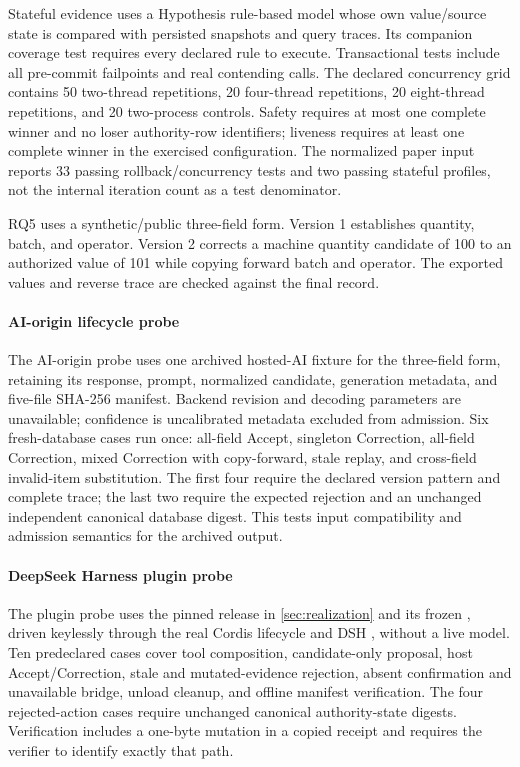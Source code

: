 Stateful evidence uses a Hypothesis rule-based model whose own value/source state is compared with persisted snapshots and query traces. Its companion coverage test requires every declared rule to execute. Transactional tests include all pre-commit failpoints and real contending calls. The declared concurrency grid contains 50 two-thread repetitions, 20 four-thread repetitions, 20 eight-thread repetitions, and 20 two-process controls. Safety requires at most one complete winner and no loser authority-row identifiers; liveness requires at least one complete winner in the exercised configuration. The normalized paper input reports 33 passing rollback/concurrency tests and two passing stateful profiles, not the internal iteration count as a test denominator.

RQ5 uses a synthetic/public three-field form. Version 1 establishes quantity, batch, and operator. Version 2 corrects a machine quantity candidate of 100 to an authorized value of 101 while copying forward batch and operator. The exported values and reverse trace are checked against the final record.

\paragraph{AI-origin lifecycle probe}
The AI-origin probe uses one archived hosted-AI fixture for the three-field form, retaining its response, prompt, normalized candidate, generation metadata, and five-file SHA-256 manifest. Backend revision and decoding parameters are unavailable; confidence is uncalibrated metadata excluded from admission. Six fresh-database cases run once: all-field Accept, singleton Correction, all-field Correction, mixed Correction with copy-forward, stale replay, and cross-field invalid-item substitution. The first four require the declared version pattern and complete trace; the last two require the expected rejection and an unchanged independent canonical database digest. This tests input compatibility and admission semantics for the archived output.

\paragraph{DeepSeek Harness plugin probe}
The plugin probe uses the pinned release in \cref{sec:realization} and its frozen , driven keylessly through the real Cordis lifecycle and DSH , without a live model. Ten predeclared cases cover tool composition, candidate-only proposal, host Accept/Correction, stale and mutated-evidence rejection, absent confirmation and unavailable bridge, unload cleanup, and offline manifest verification. The four rejected-action cases require unchanged canonical authority-state digests. Verification includes a one-byte mutation in a copied receipt and requires the verifier to identify exactly that path.

